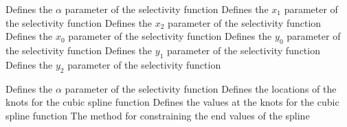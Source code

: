  {Defines the $\alpha$ parameter of the selectivity function}
 {Defines the $x_1$ parameter of the selectivity function}
 {Defines the $x_2$ parameter of the selectivity function}
 {Defines the $x_0$ parameter of the selectivity function}
 {Defines the $y_0$ parameter of the selectivity function}
 {Defines the $y_1$ parameter of the selectivity function}
 {Defines the $y_2$ parameter of the selectivity function}
\par\textbf{}\par
{} {Defines the $\alpha$ parameter of the selectivity function}
 {Defines the locations of the knots for the cubic spline function}
 {Defines the values at the knots for the cubic spline function}
 {The method for constraining the end values of the spline}
